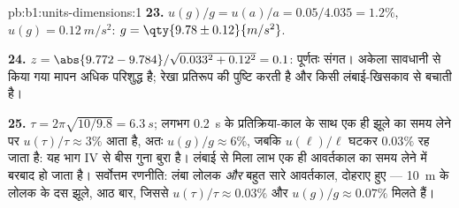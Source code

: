 \begin{solution}{pb:b1:units-dimensions:1}
\textbf{23.} $u(g)/g = u(a)/a = 0.05/4.035 = 1.2\%$, $u(g) =
\qty{0.12}{m/s^2}$: $g = \qty{9.78\pm0.12}{m/s^2}$.

\textbf{24.} $z = \abs{9.772 - 9.784}/\sqrt{0.033^2 + 0.12^2} = 0.1$:
पूर्णतः संगत। अकेला सावधानी से किया गया मापन अधिक परिशुद्ध है; रेखा प्रतिरूप
की पुष्टि करती है और किसी लंबाई-खिसकाव से बचाती है।

\textbf{25.} $\tau = 2\pi\sqrt{10/9.8} = \qty{6.3}{s}$; लगभग \qty{0.2}{s} के
प्रतिक्रिया-काल के साथ एक ही झूले का समय लेने पर $u(\tau)/\tau \approx
3\%$ आता है, अतः $u(g)/g \approx 6\%$, जबकि $u(\ell)/\ell$ घटकर
$0.03\%$ रह जाता है: यह भाग IV से बीस गुना बुरा है। लंबाई से मिला लाभ एक ही
आवर्तकाल का समय लेने में बरबाद हो जाता है। सर्वोत्तम रणनीति: लंबा लोलक
\emph{और} बहुत सारे आवर्तकाल, दोहराए हुए --- \qty{10}{m} के लोलक के दस झूले,
आठ बार, जिससे $u(\tau)/\tau \approx 0.03\%$ और $u(g)/g \approx 0.07\%$
मिलते हैं।
\end{solution}
